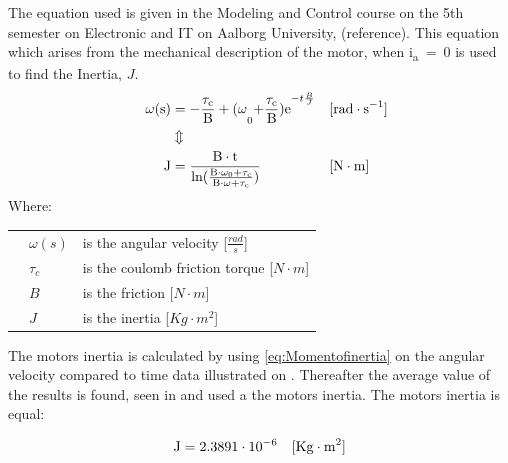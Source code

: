 The equation used is given in the Modeling and Control course on the 5th semester on Electronic and IT on Aalborg University, (reference). This equation which arises from the mechanical description of the motor, when \si{i_a = 0} is used to find the Inertia, $J$.
\begin{align}
  \eq{\omega(s)}{- \frac{\tau_c}{B}+(\omega_0 + \frac{\tau_c}{B}) e^{-t\frac{B}{J}}} \unit{rad\cdot s^{-1}}\nonumber\\
  && &\Updownarrow&&\\
  \eq{J}{ \frac{B\cdot t}{ln(  \frac{B\cdot \omega_0 + \tau_c}{B \cdot \omega + \tau_c})} } \unit{N\cdot m}\nonumber
 \label{eq:Momentofinertia}
\end{align}
\hspace{6mm} Where:\\
\begin{tabular}{p{1cm}ll}
& $\omega(s)$ & is the angular velocity [$\frac{rad}{s}$] \\
& $\tau_c$ & is the coulomb friction torque [$N \cdot m$]\\
& $B$ & is the friction [$N \cdot m$] \\
& $J$ & is the inertia [$Kg \cdot m^2$] \\
\end{tabular}

The motors inertia is calculated by using \eqref{eq:Momentofinertia} on the angular velocity compared to time data illustrated on . Thereafter the average value of the results is found, seen in  and used a the motors inertia. The motors inertia is equal:

\begin{align}
\eq{J}{\num{2.3891} \cdot 10^{-6}} \unit{Kg \cdot m^2}
 \label{eq:Momentofinertia}
\end{align}



